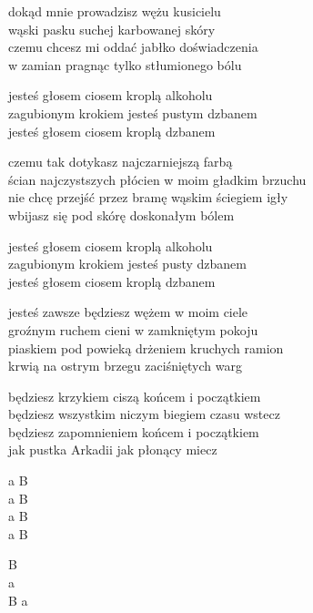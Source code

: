 \begin{text}
    dokąd mnie prowadzisz wężu kusicielu\\
    wąski pasku suchej karbowanej skóry\\
    czemu chcesz mi oddać jabłko doświadczenia\\
    w zamian pragnąc tylko stłumionego bólu

    jesteś głosem ciosem kroplą alkoholu\\
    zagubionym krokiem jesteś pustym dzbanem\\
    jesteś głosem ciosem kroplą dzbanem

    czemu tak dotykasz najczarniejszą farbą\\
    ścian najczystszych płócien w moim gładkim brzuchu\\
    nie chcę przejść przez bramę wąskim ściegiem igły\\
    wbijasz się pod skórę doskonałym bólem

    jesteś głosem ciosem kroplą alkoholu\\
    zagubionym krokiem jesteś pusty dzbanem\\
    jesteś głosem ciosem kroplą dzbanem

    jesteś zawsze będziesz wężem w moim ciele\\
    groźnym ruchem cieni w zamkniętym pokoju\\
    piaskiem pod powieką drżeniem kruchych ramion\\
    krwią na ostrym brzegu zaciśniętych warg

    będziesz krzykiem ciszą końcem i początkiem\\
    będziesz wszystkim niczym biegiem czasu wstecz\\
    będziesz zapomnieniem końcem i początkiem\\
    jak pustka Arkadii jak płonący miecz
\end{text}
\begin{chord}
    a B\\
    a B\\
    a B\\
    a B

    B\\
    a\\
    B a
\end{chord}